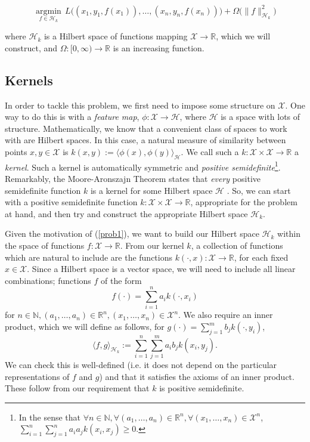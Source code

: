 \documentclass{article} %
\begin{document}
\begin{equation}
\label{prob1}
\underset{f \in \mathcal{H}_k}{\operatorname{argmin}} \, L\big((x_1,y_1,f(x_1)),\dots,(x_n,y_n,f(x_n))\big)+ \Omega\big(\|f\|^2_{\mathcal{H}_k}\big)
\end{equation}


\noindent where $\mathcal{H}_k$ is a Hilbert space of functions mapping $\mathcal{X}\rightarrow \mathbb{R}$, which we will construct, and $\Omega: [0,\infty)\rightarrow\mathbb{R}$ is an increasing function.

\subsection{Kernels}
In order to tackle this problem, we first need to impose some structure on $\mathcal{X}$. One way to do this is with a \textit{feature map}, $\phi:\mathcal{X}\rightarrow\mathcal{H}$, where $\mathcal{H}$ is a space with lots of structure. Mathematically, we know that a convenient class of spaces to work with are Hilbert spaces. In this case, a natural measure of similarity between points $x,y\in\mathcal{X}$ is $k(x,y):=\langle\phi(x),\phi(y)\rangle_\mathcal{H}$. We call such a $k:\mathcal{X}\times\mathcal{X}\rightarrow\mathbb{R}$ a \textit{kernel}. Such a kernel is automatically symmetric and \textit{positive semidefinite}\footnote{In the sense that $\forall n\in\mathbb{N}, \forall(a_1,\dots,a_n)\in\mathbb{R}^n,\forall(x_1,\dots,x_n)\in\mathcal{X}^n$, $\sum_{i=1}^n \sum_{j=1}^n a_i a_j k(x_i,x_j)\geq 0$.}. Remarkably, the Moore-Aronszajn Theorem states that \textit{every} positive semidefinite function $k$ is a kernel for some Hilbert space $\mathcal{H}$ \cite{Hofmann}. So, we can start with a positive semidefinite function $k:\mathcal{X}\times\mathcal{X}\rightarrow\mathbb{R}$, appropriate for the problem at hand, and then try and construct the appropriate Hilbert space $\mathcal{H}_k$.

Given the motivation of (\ref{prob1}), we want to build our Hilbert space $\mathcal{H}_k$ within the space of functions $f:\mathcal{X}\rightarrow\mathbb{R}$. From our kernel $k$, a collection of functions which are natural to include are the functions $k(\cdot,x):\mathcal{X}\rightarrow\mathbb{R}$, for each fixed $x \in \mathcal{X}$. Since a Hilbert space is a vector space, we will need to include all linear combinations; functions $f$ of the form $$f(\cdot)=\sum_{i=1}^n a_i k(\cdot,x_i)$$ for $n\in\mathbb{N}, (a_1,\dots,a_n)\in\mathbb{R}^n,(x_1,\dots,x_n)\in\mathcal{X}^n$. We also require an inner product, which we will define as follows, for $g(\cdot)=\sum_{j=1}^m b_j k(\cdot,y_i)$, $$\langle f,g\rangle_{\mathcal{H}_k}:=\sum_{i=1}^n \sum_{j=1}^m a_i b_j k(x_i,y_j).$$ We can check this is well-defined (i.e. it does not depend on the particular representations of $f$ and $g$) and that it satisfies the axioms of an inner product. These follow from our requirement that $k$ is positive semidefinite.
\end{document}
